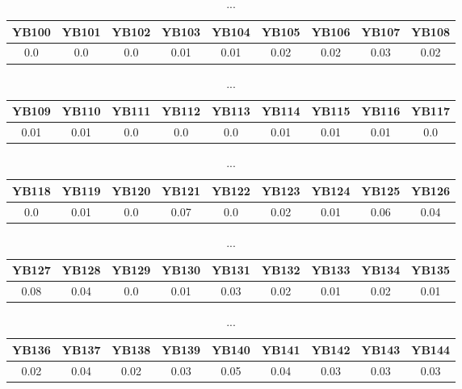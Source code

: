 \documentclass[]{article}
\begin{document}
\begin{table}[h]
	\centering
	\begin{tabular}{|c|c|c|c|c|c|c|c|c|}
		\hline
		YB100 & YB101 & YB102 & YB103 & YB104 & YB105 & YB106 & YB107 & YB108 \\
		\hline
		0.0   & 0.0   & 0.0   & 0.01  & 0.01  & 0.02  & 0.02  & 0.03  & 0.02  \\
		\hline
	\end{tabular}
	\caption{...}
\end{table}
\begin{table}[h]
	\centering
	\begin{tabular}{|c|c|c|c|c|c|c|c|c|}
		\hline
		YB109 & YB110 & YB111 & YB112 & YB113 & YB114 & YB115 & YB116 & YB117 \\
		\hline
		0.01  & 0.01  & 0.0   & 0.0   & 0.0   & 0.01  & 0.01  & 0.01  & 0.0   \\
		\hline
	\end{tabular}
	\caption{...}
\end{table}
\begin{table}[h]
	\centering
	\begin{tabular}{|c|c|c|c|c|c|c|c|c|}
		\hline
		YB118 & YB119 & YB120 & YB121 & YB122 & YB123 & YB124 & YB125 & YB126 \\
		\hline
		0.0   & 0.01  & 0.0   & 0.07  & 0.0   & 0.02  & 0.01  & 0.06  & 0.04  \\
		\hline
	\end{tabular}
	\caption{...}
\end{table}
\begin{table}[h]
	\centering
	\begin{tabular}{|c|c|c|c|c|c|c|c|c|}
		\hline
		YB127 & YB128 & YB129 & YB130 & YB131 & YB132 & YB133 & YB134 & YB135 \\
		\hline
		0.08  & 0.04  & 0.0   & 0.01  & 0.03  & 0.02  & 0.01  & 0.02  & 0.01  \\
		\hline
	\end{tabular}
	\caption{...}
\end{table}
\begin{table}[h]
	\centering
	\begin{tabular}{|c|c|c|c|c|c|c|c|c|}
		\hline
		YB136 & YB137 & YB138 & YB139 & YB140 & YB141 & YB142 & YB143 & YB144 \\
		\hline
		0.02  & 0.04  & 0.02  & 0.03  & 0.05  & 0.04  & 0.03  & 0.03  & 0.03  \\
		\hline
	\end{tabular}
	\caption{...}
\end{table}
\end{document}
